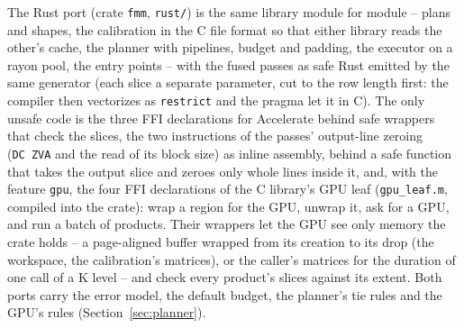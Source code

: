\documentclass[11pt]{article}
\begin{document}
The Rust port (crate \texttt{fmm}, \texttt{rust/}) is the same library module
for module -- plans and shapes, the calibration in the C file format so that
either library reads the other's cache, the planner with pipelines, budget
and padding, the executor on a rayon pool, the entry points -- with the
fused passes as safe Rust emitted by the same generator (each slice a
separate parameter, cut to the row length first: the compiler then
vectorizes as \texttt{restrict} and the pragma let it in C).  The only unsafe
code is the three FFI declarations for Accelerate behind safe wrappers that
check the slices, the two instructions of the passes' output-line zeroing
(\texttt{DC~ZVA} and the read of its block size) as inline assembly, behind
a safe function that takes the output slice and zeroes only whole lines inside
it, and, with the feature \texttt{gpu}, the four FFI declarations of the C
library's GPU leaf (\texttt{gpu\_leaf.m}, compiled into the crate): wrap a
region for the GPU, unwrap it, ask for a GPU, and run a batch of products.
Their wrappers let the GPU see only memory the crate holds -- a page-aligned
buffer wrapped from its creation to its drop (the workspace, the
calibration's matrices), or the caller's matrices for the duration of one call
of a K level -- and check every product's slices against its extent.  Both
ports carry the error model, the default budget, the planner's tie rules and
the GPU's rules (Section~\ref{sec:planner}).
\end{document}
